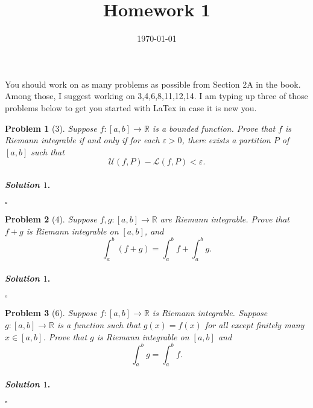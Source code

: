 \documentclass[reqno]{amsart}
\theoremstyle{plain}
\newtheorem{problem}{Problem}
\theoremstyle{definition}
\newenvironment{solution1}{\paragraph{\emph{Solution $1$}.}}{\hfill$\square$}
\begin{document}
 

\title[Homework 1]{Homework 1}

\date{\today} 
\maketitle 

You should work on as many problems as possible from Section 2A in the book.  Among those, I suggest working on 3,4,6,8,11,12,14.  I am typing up three of those problems below to get you started with LaTex in case it is new you.

\begin{problem}[3]
Suppose $f:[a,b] \rightarrow \mathbb{R}$ is a bounded function.  Prove that $f$ is Riemann integrable if and only if for each $\varepsilon > 0$, there exists a partition $P$ of $[a,b]$ such that
$$\mathcal{U}(f,P) - \mathcal{L}(f,P) < \varepsilon. $$
\end{problem}

\begin{solution1}

\end{solution1}


\begin{problem}[4]
Suppose $f,g:[a,b] \rightarrow \mathbb{R}$ are Riemann integrable.  Prove that $f+g$ is Riemann integrable on $[a,b]$, and
$$\int_{a}^{b}(f+g) = \int_{a}^{b}f + \int_{a}^{b} g. $$
\end{problem}
\begin{solution1}

\end{solution1}

\begin{problem}[6]
Suppose $f:[a,b] \rightarrow \mathbb{R}$ is Riemann integrable.  Suppose $g:[a,b] \rightarrow \mathbb{R}$ is a function such that $g(x) = f(x)$ for all except finitely many $x \in [a,b]$.  Prove that $g$ is Riemann integrable on $[a,b]$ and
$$\int_{a}^{b}g = \int_{a}^{b}f. $$
\end{problem}
\begin{solution1}

\end{solution1}
\end{document}

